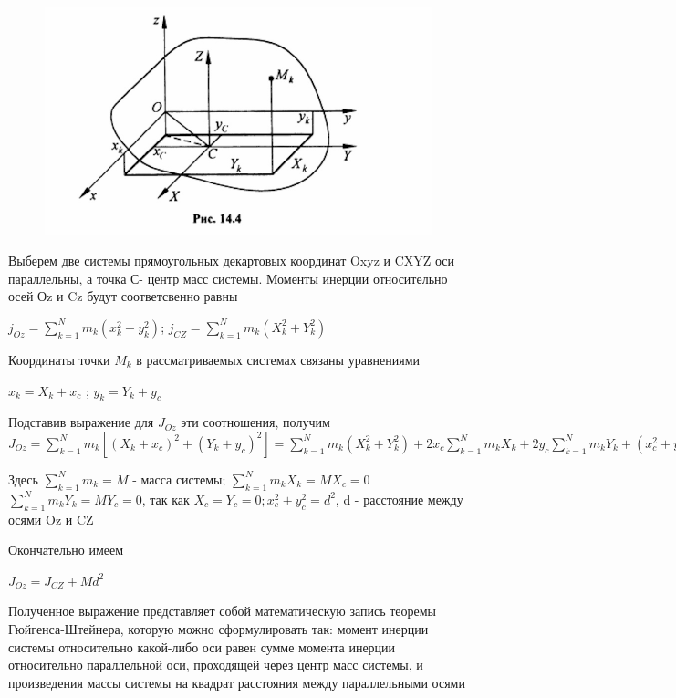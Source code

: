 {\begin{center}
\begin{figure}[H]
        \centering\includegraphics[scale=0.3]{img/14.4.jpeg} 
    \end{figure}
    \par Выберем две системы прямоугольных декартовых координат Oxyz и CXYZ оси параллельны, а точка С- центр масс системы. Моменты инерции относительно осей Оz и Cz будут соответсвенно равны 
    \par $ j_{Oz} = \sum_{k=1}^N {m_k (x_k^2+y_k^2)}$; $ j_{CZ} = \sum_{k=1}^N {m_k (X_k^2+Y_k^2)}$
    \par Координаты точки $M_k$ в рассматриваемых системах связаны уравнениями 
    \par $x_k= X_k+x_c$ ; $y_k= Y_k+y_c$
    \par Подставив выражение для $J_{Oz}$ эти соотношения, получим 
    $J_{Oz} = \sum_{k=1}^N  {m_k[(X_k+x_c)^2 + (Y_k + y_c)^2]} = \sum_{k=1}^N {m_k (X_k^2 + Y_k^2)} + 2x_c \sum_{k=1}^N {m_k X_k} + 2y_c \sum_{k=1}^N {m_k Y_k} + (x^2_c+y^2_c) \sum_{k=1}^N {m_k} $
    \par Здесь $\sum_{k=1}^N {m_k}= M$ - масса системы; $\sum_{k=1}^N {m_k  X_k} = MX_c=0$ $\sum_{k=1}^N {m_k Y_k} =MY_c=0 $, так как $X_c=Y_c=0; x_c^2+y^2_c=d^2$, d - расстояние между осями Oz и CZ
    \par Окончательно имеем 
    \par $J_{Oz} = J_{CZ} + Md^2$
    \par Полученное выражение представляет собой математическую запись теоремы Гюйгенса-Штейнера,  которую можно сформулировать так: момент инерции системы относительно какой-либо оси равен сумме момента инерции относительно параллельной оси, проходящей через центр масс системы, и произведения массы системы на квадрат расстояния между параллельными осями
\end{center}

}
